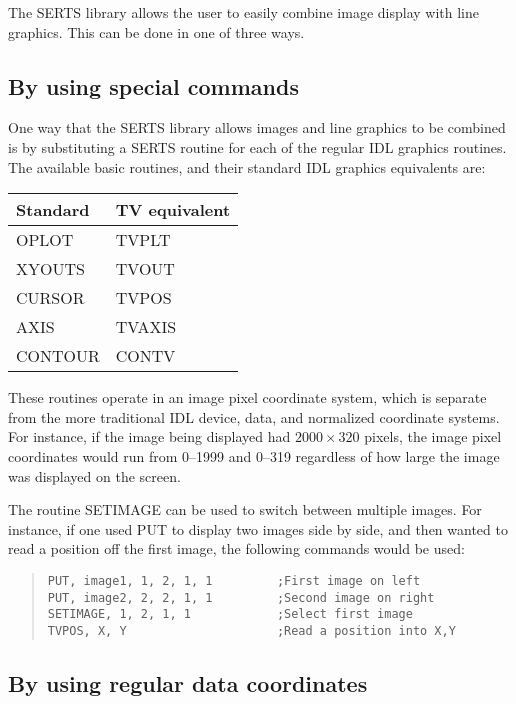 The SERTS library allows the user to easily combine image display with line
graphics.  This can be done in one of three ways.

\subsection{By using special commands}
\label{equivalents}

One way that the SERTS library allows images and line graphics to be combined
is by substituting a SERTS routine for each of the regular IDL graphics
routines.  The available basic routines, and their standard IDL graphics
equivalents are:
\begin{center}
\begin{tabular}{|l|l|}
\hline
Standard	& TV equivalent\\
\hline
OPLOT		& TVPLT\\
XYOUTS		& TVOUT\\
CURSOR		& TVPOS\\
AXIS		& TVAXIS\\
CONTOUR		& CONTV\\
\hline
\end{tabular}
\end{center}

These routines operate in an image pixel coordinate system, which is separate
from the more traditional IDL device, data, and normalized coordinate systems.
For instance, if the image being displayed had \mbox{$2000 \times 320$} pixels,
the image pixel coordinates would run from 0--1999 and 0--319 regardless of how
large the image was displayed on the screen.

The routine SETIMAGE can be used to switch between multiple images.  For
instance, if one used PUT to display two images side by side, and then wanted
to read a position off the first image, the following commands would be used:
\begin{quote}
\begin{verbatim}
PUT, image1, 1, 2, 1, 1         ;First image on left
PUT, image2, 2, 2, 1, 1         ;Second image on right
SETIMAGE, 1, 2, 1, 1            ;Select first image
TVPOS, X, Y                     ;Read a position into X,Y
\end{verbatim}
\end{quote}

\subsection{By using regular data coordinates}
\label{data_coord}

